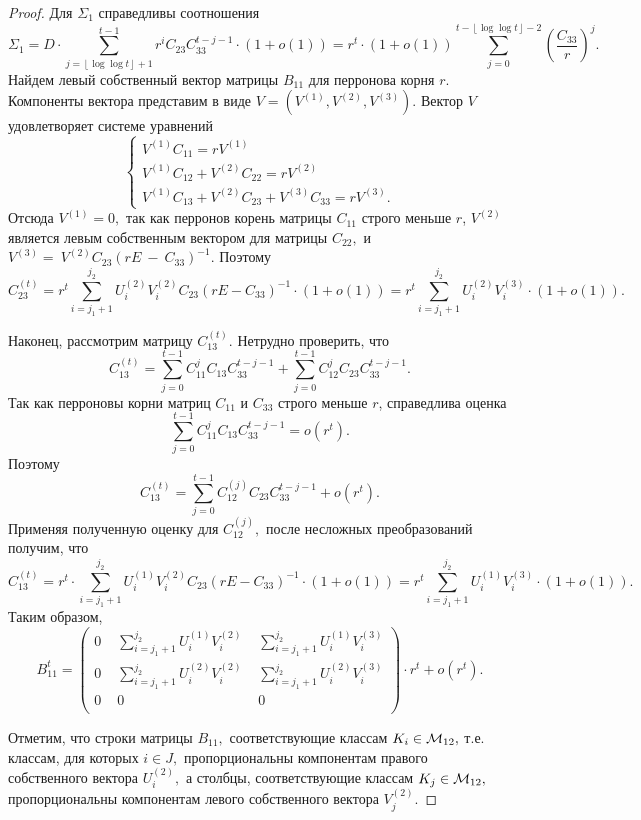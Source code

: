 \documentclass[10pt]{article}
\begin{document}
\begin{proof}
Для $\Sigma_1$ справедливы соотношения
$$
\Sigma_1=D \cdot \sum_{j=\left\lfloor \log \log t\right\rfloor+1}^{t-1}r^i C_{23} C_{33}^{t-j-1}\cdot (1+o(1)) =
r^t\cdot (1+o(1)) \sum_{j=0}^{t-\left\lfloor \log \log t\right\rfloor-2}\left(\frac{C_{33}}{r}\right)^{j}.
$$
Найдем левый  собственный вектор матрицы $B_{11}$ для перронова корня $r.$
Компоненты вектора представим в виде $V=(V^{(1)},V^{(2)},V^{(3)}).$ Вектор $V$ удовлетворяет системе уравнений
$$\left\{
\begin{array}{l}
V^{(1)}C_{11}=r V^{(1)} \\
V^{(1)}C_{12}+V^{(2)}C_{22}=r V^{(2)}\\
V^{(1)}C_{13}+ V^{(2)}C_{23}+V^{(3)}C_{33}=r V^{(3)}.
\end{array}
\right.
$$
Отсюда $V^{(1)}=0,$ так как перронов корень матрицы $C_{11}$ строго меньше $r$, $V^{(2)}$ является левым собственным вектором для матрицы $C_{22},$ и $V^{(3)}=~V^{(2)}C_{23}(rE~-~C_{33})^{-1}.$ 
Поэтому
$$
C_{23}^{(t)}=r^{t}\sum^{j_2}_{i=j_1+1}U_i^{(2)}V_i^{(2)}C_{23}(rE-C_{33})^{-1}\cdot(1+o(1))=r^{t}\sum^{j_2}_{i=j_1+1}U_i^{(2)}V_i^{(3)}\cdot(1+o(1)).
$$

Наконец, рассмотрим матрицу $C_{13}^{(t)}.$ Нетрудно проверить, что 
$$
C_{13}^{(t)}=\sum_{j=0}^{t-1}C_{11}^{j}C_{13} C_{33}^{t-j-1}+\sum_{j=0}^{t-1}C_{12}^{j}C_{23} C_{33}^{t-j-1}.
$$
Так как перроновы корни матриц $C_{11}$ и $C_{33}$ строго меньше $r$, справедлива оценка 
$$
\sum_{j=0}^{t-1}C_{11}^{j}C_{13} C_{33}^{t-j-1}=o(r^t).
$$
Поэтому
$$
C_{13}^{(t)}=\sum_{j=0}^{t-1}C_{12}^{(j)}C_{23} C_{33}^{t-j-1}+o(r^t).
$$
Применяя полученную оценку для $C_{12}^{(j)},$ после несложных преобразований получим, что
$$
C_{13}^{(t)}=r^t\cdot\sum^{j_2}_{i=j_1+1}U_i^{(1)}V_i^{(2)}C_{23}(rE-C_{33})^{-1}\cdot(1+o(1))=
r^{t}\sum^{j_2}_{i=j_1+1}U_i^{(1)}V_i^{(3)}\cdot(1+o(1)).
$$
Таким образом, 
\begin{equation} \label{zhileqv7}
B_{11}^t=\left(
\begin{array}{ccc} 
0\,\, & \sum^{j_2}_{i=j_1+1}U_i^{(1)}V_i^{(2)} \,\, & \sum^{j_2}_{i=j_1+1}U_i^{(1)}V_i^{(3)} \\
0 \,\,&    \sum^{j_2}_{i=j_1+1}U_i^{(2)}V_i^{(2)} \,\,  & \sum^{j_2}_{i=j_1+1}U_i^{(2)}V_i^{(3)} \\
0\,\, & 0 \,\,&   0 \\
\end{array}
\right) \cdot r^t +o(r^t).
\end{equation}

Отметим, что строки матрицы $B_{11},$ соответствующие классам $K_i \in {\cal M}_{12},$ т.е. классам, для которых $i \in J,$ пропорциональны компонентам правого собственного вектора $U_i^{(2)},$ а столбцы, соответствующие классам $K_j \in {\cal M}_{12},$
пропорциональны компонентам левого собственного вектора $V_j^{(2)}.$


\end{proof}
\end{document}
